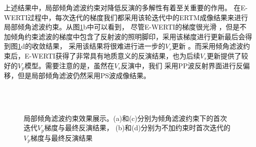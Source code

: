 上述结果中，局部倾角滤波约束对降低反演的多解性有着至关重要的作用。
在E-WERTI过程中，每次迭代的梯度我们都采用该轮迭代中的ERTM成像结果来进行局部倾角滤波约束。从图\ref{fig:LSF_comparison}b中可以看到，
尽管E-WERTI的梯度很光滑
，但是不加倾角约束滤波的梯度中包含了反射波的照明脚印，采用该梯度进行更新最后会得到图\ref{fig:LSF_comparison}d的收敛结果，
采用该结果将很难进行进一步的$V_s$更新
。而采用倾角滤波约束后，E-WERTI获得了非常具有地质意义的反演结果，也为后续$V_s$更新提供了较好的$V_p$模型。需要注意的是，虽然在$V_s$反演中，我们
采用PP波反射界面进行反偏移，但是局部倾角滤波仍然采用PS波成像结果。
\begin{figure}[!htb]
   \centering
   \\
   \\
   \caption{局部倾角滤波约束效果展示。(a)和(c)分别为倾角滤波约束下的首次迭代$V_p$梯度与最终反演结果，
   (b)和(d)分别为不加约束时首次迭代的$V_p$梯度与最终反演结果}
   \label{fig:LSF_comparison}
\end{figure}

